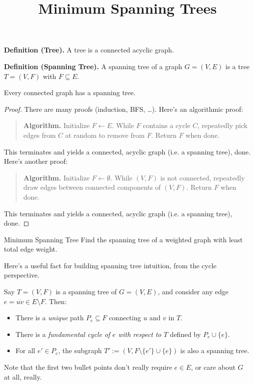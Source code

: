 \title{Minimum Spanning Trees}



\textbf{Definition (Tree).} A tree is a connected acyclic graph.

\textbf{Definition (Spanning Tree).} A spanning tree of a graph $G = (V, E)$ is a tree $T = (V, F)$ with $F \subseteq E$.

\begin{claim}
    Every connected graph has a spanning tree.
\end{claim}

\begin{proof}
    There are many proofs (induction, BFS, \dots).  Here's an algorithmic proof:
    \begin{quote}
        \textbf{Algorithm.} Initialize $F \leftarrow E$.  While $F$ contains a cycle $C$, repeatedly pick edges from $C$ at random to remove from $F$.  Return $F$ when done.
    \end{quote}
    This terminates and yields a connected, acyclic graph (i.e. a spanning tree), done.  Here's another proof:
    \begin{quote}
        \textbf{Algorithm.} Initialize $F \leftarrow \emptyset$.  While $(V, F)$ is not connected, repeatedly draw edges between connected components of $(V, F)$.  Return $F$ when done.
    \end{quote}
    This terminates and yields a connected, acyclic graph (i.e. a spanning tree), done.
\end{proof}

\begin{problem}{Minimum Spanning Tree}
    Find the spanning tree of a weighted graph with least total edge weight.
\end{problem}

Here's a useful fact for building spanning tree intuition, from the cycle perspective.

\begin{claim}
    Say $T = (V, F)$ is a spanning tree of $G = (V, E)$, and consider any edge $e = \overline{uv} \in E \setminus F$.  Then:
    \begin{itemize}
        \item There is a \emph{unique} path $P_e \subseteq F$ connecting $u$ and $v$ in $T$.
        \item There is a \emph{fundamental cycle of $e$ with respect to $T$} defined by $P_e \cup \{e\}$.
        \item For all $e' \in P_e$, the subgraph $T' := (V, F \setminus \{e'\} \cup \{e\})$ is also a spanning tree.
    \end{itemize}
    Note that the first two bullet points don't really require $e \in E$, or care about $G$ at all, really.
\end{claim}

